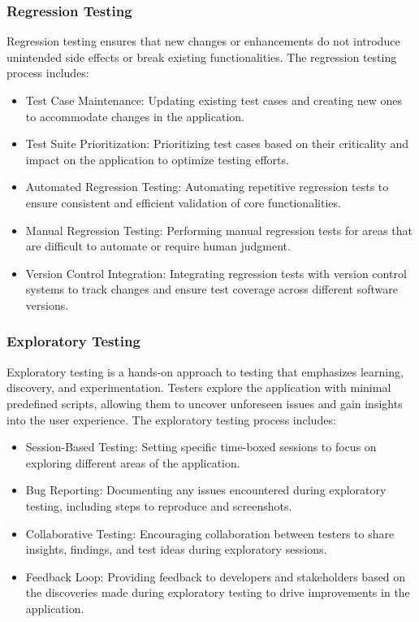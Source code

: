		\subsubsection{Regression Testing}
		
		Regression testing ensures that new changes or enhancements do not introduce unintended side effects or break existing functionalities. The regression testing process includes:
		
		\begin{itemize}
			\item Test Case Maintenance: Updating existing test cases and creating new ones to accommodate changes in the application.
			\item Test Suite Prioritization: Prioritizing test cases based on their criticality and impact on the application to optimize testing efforts.
			\item Automated Regression Testing: Automating repetitive regression tests to ensure consistent and efficient validation of core functionalities.
			\item Manual Regression Testing: Performing manual regression tests for areas that are difficult to automate or require human judgment.
			\item Version Control Integration: Integrating regression tests with version control systems to track changes and ensure test coverage across different software versions.
		\end{itemize}
		
		\subsubsection{Exploratory Testing}
		
		Exploratory testing is a hands-on approach to testing that emphasizes learning, discovery, and experimentation. Testers explore the application with minimal predefined scripts, allowing them to uncover unforeseen issues and gain insights into the user experience. The exploratory testing process includes:
		
		\begin{itemize}
			\item Session-Based Testing: Setting specific time-boxed sessions to focus on exploring different areas of the application.
			\item Bug Reporting: Documenting any issues encountered during exploratory testing, including steps to reproduce and screenshots.
			\item Collaborative Testing: Encouraging collaboration between testers to share insights, findings, and test ideas during exploratory sessions.
			\item Feedback Loop: Providing feedback to developers and stakeholders based on the discoveries made during exploratory testing to drive improvements in the application.
		\end{itemize}
		
